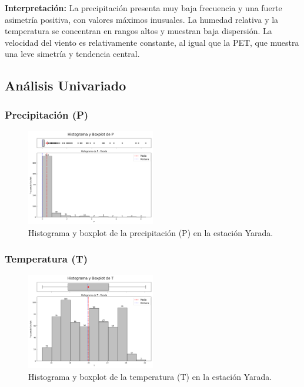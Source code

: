 \textbf{Interpretación:} La precipitación presenta muy baja frecuencia y una fuerte asimetría positiva, con valores máximos inusuales. La humedad relativa y la temperatura se concentran en rangos altos y muestran baja dispersión. La velocidad del viento es relativamente constante, al igual que la PET, que muestra una leve simetría y tendencia central.

\subsection{Análisis Univariado}

\subsubsection*{Precipitación (P)}
\begin{figure}[H]
\centering
\includegraphics[width=0.5\textwidth]{resultados/por_estacion_meteorologica/Yarada/P_histograma.png}
\caption{Histograma y boxplot de la precipitación (P) en la estación Yarada.}
\label{fig:yarada_P}
\end{figure}

\subsubsection*{Temperatura (T)}
\begin{figure}[H]
\centering
\includegraphics[width=0.5\textwidth]{resultados/por_estacion_meteorologica/Yarada/T_histograma.png}
\caption{Histograma y boxplot de la temperatura (T) en la estación Yarada.}
\label{fig:yarada_T}
\end{figure}

